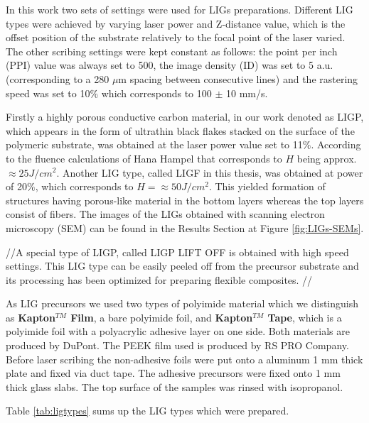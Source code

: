 In this work two sets of settings were used for LIGs preparations. Different LIG types were achieved by varying laser power and Z-distance value, which is the offset position of the substrate relatively to the focal point of the laser varied. The other scribing settings were kept constant as follows: the point per inch (PPI) value was always set to 500, the image density (ID) was set to 5 a.u. (corresponding to a 280 $\mu$m spacing between consecutive lines) and the rastering speed was set to 10$\%$ which corresponds to 100 $\pm$ 10 mm/s. 

Firstly a highly porous conductive carbon material, in our work denoted as LIGP, which appears in the form of ultrathin black flakes stacked on the surface of the polymeric substrate, was obtained at the laser power value set to 11$\%$. According to the fluence calculations of Hana Hampel \cite{hana} that corresponds to $H$ being approx. $\approx25 J/cm^2$. Another LIG type, called LIGF in this thesis, was obtained at power of 20$\%$, which corresponds to $H = \approx50 J/cm^2$. This yielded formation of structures having porous-like material in the bottom layers whereas the top layers consist of fibers. The images of the LIGs obtained with scanning electron microscopy (SEM) can be found in the Results Section at Figure \ref{fig:LIGs-SEMs}.

 //A special type of LIGP, called LIGP LIFT OFF is obtained with high speed settings. This LIG type can be easily peeled off from the precursor substrate and its processing has been optimized for preparing flexible composites. //


As LIG precursors we used two types of polyimide material which we distinguish as \textbf{Kapton$^{TM}$ Film}, a bare polyimide foil, and \textbf{Kapton$^{TM}$ Tape}, which is a polyimide foil with a polyacrylic adhesive layer on one side. Both materials are produced by DuPont. The PEEK film used is produced by RS PRO Company. Before laser scribing the non-adhesive foils were put onto a aluminum 1 mm thick plate and fixed via duct tape. The adhesive precursors were fixed onto 1 mm thick glass slabs. The top surface of the samples was rinsed with isopropanol. 

Table \ref{tab:ligtypes} sums up the LIG types which were prepared.  

